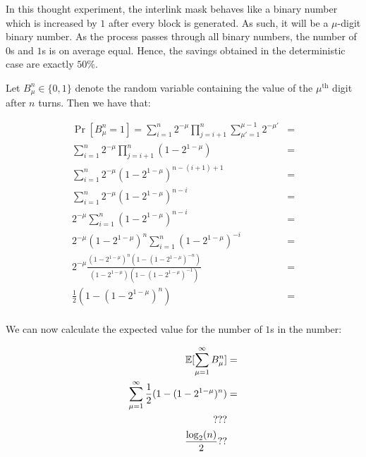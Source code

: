 In this thought experiment, the interlink mask behaves like a binary number
which is increased by $1$ after every block is generated. As such, it will be a
$\mu$-digit binary number. As the process passes through all binary numbers, the
number of $0$s and $1$s is on average equal. Hence, the savings obtained in the
deterministic case are exactly $50\%$.


Let $B^n_\mu \in \{0, 1\}$ denote the random variable containing the value of
the $\mu^{\text{th}}$ digit after $n$ turns. Then we have that:

\begin{align*}
\Pr[B^n_\mu = 1] =
\sum_{i = 1}^n 2^{-\mu} \prod_{j = i + 1}^n \sum_{\mu' = 1}^{\mu - 1} 2^{-\mu'} &=\\
\sum_{i = 1}^n 2^{-\mu} \prod_{j = i + 1}^n (1 - 2^{1 - \mu}) &=\\
\sum_{i = 1}^n 2^{-\mu} (1 - 2^{1 -\mu})^{n - (i + 1) + 1} &=\\
\sum_{i = 1}^n 2^{-\mu} (1 - 2^{1 -\mu})^{n - i} &=\\
2^{-\mu} \sum_{i = 1}^n (1 - 2^{1 -\mu})^{n - i} &=\\
2^{-\mu} (1 - 2^{1 - \mu})^n \sum_{i = 1}^n (1 - 2^{1 -\mu})^{-i} &=\\
2^{-\mu} \frac{(1 - 2^{1 - \mu})^n (1 - (1 - 2^{1-\mu})^{-n})}{(1 - 2^{1 - \mu})(1 - (1 - 2^{1 - \mu})^{-1})} &=\\
\frac{1}{2} (1 - (1 - 2^{1 - \mu})^n) &=\\
\end{align*}


We can now calculate the expected value for the number of $1$s in the
number:

\begin{align*}
  \operatorname{\mathbb{E}}[\sum_{\mu = 1}^\infty B^n_\mu] &= \\
  \sum_{\mu = 1}^\infty \frac{1}{2} (1 - (1 - 2^{1 - \mu})^n) &=\\
  ???\\
  \frac{\log_2(n)}{2}??
\end{align*}

